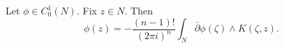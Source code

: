 
Let $\phi \in C_0^1(N)$. Fix $z \in N$. Then
$$\phi(z) = -\frac{(n-1)!}{(2\pi i)^n} \int_N \bar{\partial} \phi(\zeta) \wedge K(\zeta, z).$$
